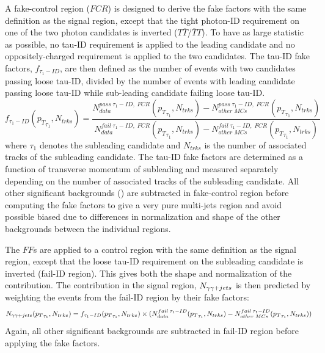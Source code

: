 A fake-\tauh control region ($FCR$) is designed to derive the fake factors with the same definition as the signal region, except that the tight photon-ID requirement on one of the two photon candidates is inverted ($T\overline{T}$/$\overline{T}T$). To have as large statistic as possible, no tau-ID requirement is applied to the leading \tauh candidate and no oppositely-charged requirement is applied to the two \tauh candidates. The tau-ID fake factors, $f_{\tau_{1}-ID}$, are then defined as the number of events with two \tauh candidates passing loose tau-ID, divided by the number of events with leading \tauh candidate passing loose tau-ID while sub-leading \tauh candidate failing loose tau-ID.
\begin{equation}
f_{\tau_{1}-ID}({p_{T}}_{\tau_{1}},N_{trks})=\frac{N^{pass\;\tau_{1}-ID,\;FCR}_{data}({p_{T}}_{\tau_{1}},N_{trks}) - N^{pass\;\tau_{1}-ID,\;FCR}_{other\;MCs}({p_{T}}_{\tau_{1}},N_{trks})}{N^{fail\;\tau_{1}-ID,\;FCR}_{data}({p_{T}}_{\tau_{1}},N_{trks}) - N^{fail\;\tau_{1}-ID,\;FCR}_{other\;MCs}({p_{T}}_{\tau_{1}},N_{trks})}
\end{equation}
where $\tau_{1}$ denotes the subleading \tauh candidate and $N_{trks}$ is the number of associated tracks of the subleading \tauh candidate. The tau-ID fake factors are determined as a function of transverse momentum of subleading \tauh and measured separately depending on the number of associated tracks of the subleading \tauh candidate. All other significant backgrounds () are subtracted in fake-\tauh control region before computing the fake factors to give a very pure multi-jets region and avoid possible biased due to differences in normalization and shape of the other backgrounds between the individual regions.


The $FF$s are applied to a control region with the same definition as the signal region, except that the loose tau-ID requirement on the subleading \tauh candidate is inverted (fail-ID region). This gives both the shape and normalization of the \yyjet contribution. The \yyjet contribution in the signal region, $N_{\gamma\gamma+jets}$ is then predicted by weighting the events from the fail-ID region by their fake factors:
\begin{equation}
N_{\gamma\gamma+jets}({p_{T}}_{\tau_{1}},N_{trks})=f_{\tau_{1}-ID}({p_{T}}_{\tau_{1}},N_{trks})\times(N^{fail\;\tau_{1}-ID}_{data}({p_{T}}_{\tau_{1}},N_{trks}) - N^{fail\;\tau_{1}-ID}_{other\;MCs}({p_{T}}_{\tau_{1}},N_{trks}))
\end{equation}
Again, all other significant backgrounds are subtracted in fail-ID region before applying the fake factors. 

